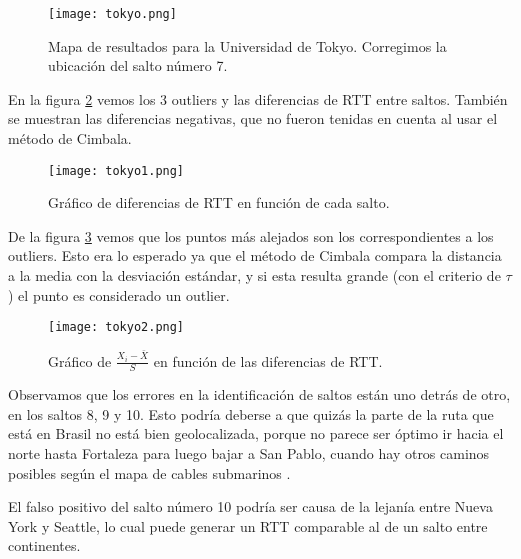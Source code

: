 \begin{figure}[H]
\texttt{[image: tokyo.png]}
\caption{Mapa de resultados para la Universidad de Tokyo. Corregimos la ubicación del salto número 7.}
\label{mapa1}
\end{figure}

En la figura \ref{diff1} vemos los 3 outliers y las diferencias de RTT entre saltos. También se muestran las diferencias negativas, que no fueron tenidas en cuenta al usar el método de Cimbala.

\begin{figure}[H]
\centering
\texttt{[image: tokyo1.png]}
\caption{Gráfico de diferencias de RTT en función de cada salto.}
\label{diff1}
\end{figure}

De la figura \ref{sdev1} vemos que los puntos más alejados son los correspondientes a los outliers. Esto era lo esperado ya que el método de Cimbala compara la distancia a la media con la desviación estándar, y si esta resulta grande (con el criterio de $\tau$) el punto es considerado un outlier.

\begin{figure}[H]
\centering
\texttt{[image: tokyo2.png]}
\caption{Gráfico de $\frac{X_i - \bar{X}}{S}$ en función de las diferencias de RTT.}
\label{sdev1}
\end{figure}

Observamos que los errores en la identificación de saltos están uno detrás de otro, en los saltos 8, 9 y 10. Esto podría deberse a que quizás la parte de la ruta que está en Brasil no está bien geolocalizada, porque no parece ser óptimo ir hacia el norte hasta Fortaleza para luego bajar a San Pablo, cuando hay otros caminos posibles según el mapa de cables submarinos \cite{cables}.

El falso positivo del salto número 10 podría ser causa de la lejanía entre Nueva York y Seattle, lo cual puede generar un RTT comparable al de un salto entre continentes.



